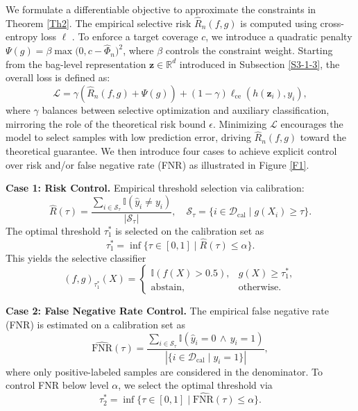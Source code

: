 \documentclass[sigconf,review,anonymous]{acmart}
\theoremstyle{remark}
\begin{document}
We formulate a differentiable objective to approximate the constraints in Theorem \ref{Th2}. The empirical selective risk $\hat{R}_n(f,g)$ is computed using cross-entropy loss $\ell$ \cite{geifman2019selectivenet}. To enforce a target coverage $c$, we introduce a quadratic penalty $\Psi(g) = \beta \max\big(0, c - \hat{\Phi}_n \big)^2$, where $\beta$ controls the constraint weight. Starting from the bag-level representation $\mathbf{z} \in \mathbb{R}^d$ introduced in Subsection \ref{S3-1-3}, the overall loss is defined as:
\begin{equation*}
    \mathcal{L} = \gamma \left(\hat{R}_n(f,g) + \Psi(g)\right) + (1-\gamma) \ell_{\mathrm{ce}}(h(\mathbf{z}_i), y_i),
\end{equation*}
where $\gamma$ balances between selective optimization and auxiliary classification, mirroring the role of the theoretical risk bound $\epsilon$. Minimizing $\mathcal{L}$ encourages the model to select samples with low prediction error, driving $\hat{R}_n(f,g)$ toward the theoretical guarantee. We then introduce four cases to achieve explicit control over risk and/or false negative rate (FNR) as illustrated in Figure \ref{F1}.

\textbf{Case 1: Risk Control.}
Empirical threshold selection via calibration:
\[
\hat{R}(\tau)=\frac{\sum_{i\in\mathcal{S}_\tau}\mathbb{I}(\hat{y}_i \neq y_i)}{|\mathcal{S}_\tau|},
\quad
\mathcal{S}_\tau=\{i\in\mathcal{D}_{\mathrm{cal}}\mid g(X_i)\geq \tau\}.
\]
The optimal threshold $\tau_{1}^*$ is selected on the calibration set as
\begin{equation}\label{Eq1}
    \tau_{1}^*=\inf\{\tau \in[0,1]\mid\hat{R}(\tau)\leq\alpha\}.
\end{equation}
This yields the selective classifier
\[
(f,g)_{\tau_{1}^*}(X)=
\begin{cases}
\mathbb{I}\!\left(f(X)>0.5\right), & g(X)\geq \tau_{1}^*,\\[4pt]
\text{abstain}, & \text{otherwise}.
\end{cases}
\]

\textbf{Case 2: False Negative Rate Control.}
The empirical false negative rate (FNR) is estimated on a calibration set as
\[
\widehat{\mathrm{FNR}}(\tau)=\frac{\sum_{i \in\mathcal{S}_\tau}\mathbb{I}(\hat{y}_i=0\,\wedge\, y_i=1)}{|\{i\in\mathcal{D}_{\mathrm{cal}}\mid y_i=1\}|},
\]
where only positive-labeled samples are considered in the denominator. To control FNR below level $\alpha$, we select the optimal threshold via 
\begin{equation}\label{Eq2}
  \tau_{2}^*=\inf\{\tau\in[0,1]\mid \widehat{\mathrm{FNR}}(\tau)\leq\alpha\}.  
\end{equation}
\end{document}

